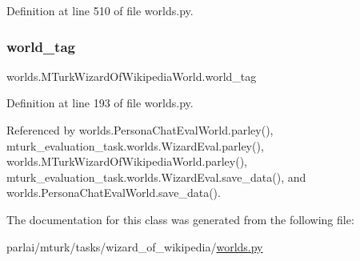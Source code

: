 Definition at line 510 of file worlds.\+py.

\mbox{\label{classworlds_1_1MTurkWizardOfWikipediaWorld_a285ebfae1d64f9535e4142dba8069fa2}} 
\subsubsection{\texorpdfstring{world\+\_\+tag}{world\_tag}}
{\footnotesize\ttfamily worlds.\+M\+Turk\+Wizard\+Of\+Wikipedia\+World.\+world\+\_\+tag}



Definition at line 193 of file worlds.\+py.



Referenced by worlds.\+Persona\+Chat\+Eval\+World.\+parley(), mturk\+\_\+evaluation\+\_\+task.\+worlds.\+Wizard\+Eval.\+parley(), worlds.\+M\+Turk\+Wizard\+Of\+Wikipedia\+World.\+parley(), mturk\+\_\+evaluation\+\_\+task.\+worlds.\+Wizard\+Eval.\+save\+\_\+data(), and worlds.\+Persona\+Chat\+Eval\+World.\+save\+\_\+data().



The documentation for this class was generated from the following file\+:\begin{DoxyCompactItemize}
\item 
parlai/mturk/tasks/wizard\+\_\+of\+\_\+wikipedia/\hyperlink{parlai_2mturk_2tasks_2wizard__of__wikipedia_2worlds_8py}{worlds.\+py}\end{DoxyCompactItemize}
